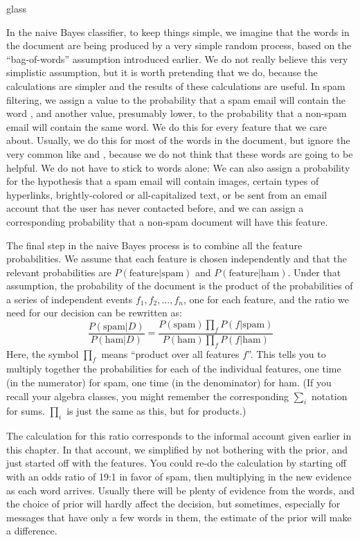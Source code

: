 \begin{tblsfilledsymbol}{}{glass}
\begin{underthehood}
In the naive Bayes classifier, to keep things simple, we imagine that
the words in the document are being produced by a very simple random
process, based on the ``bag-of-words'' assumption introduced
earlier. We do not really believe this very simplistic assumption, but
it is worth pretending that we do, because the calculations are
simpler and the results of these calculations are useful.  In spam
filtering, we assign a value to the probability that a spam email
 will contain the word , and another value,
presumably lower, to the probability that a non-spam email will
contain the same word. We do this for every feature that we care
about.  Usually, we do this for most of the words in the document,
but ignore the very common  like  and
, because we do not think that these words are going to be
helpful.  We do not have to stick to
words alone: We can also assign a probability for the hypothesis that
a spam email will contain images, certain types of hyperlinks, brightly-colored or all-capitalized text,  or be sent from an email account that the user has never contacted before, and we can assign a
corresponding probability that a non-spam document will have this
feature.

The final step in the naive Bayes process is to combine  all
the feature probabilities. We assume that each feature is chosen
independently and that the relevant probabilities are
\(P(\mbox{feature}|\mbox{spam})\) and
\(P(\mbox{feature}|\mbox{ham})\). Under that assumption, the probability of the
document is the product of the probabilities of a series of
independent events 
\(f_1,f_2,\ldots,f_n\),
one for each feature, and the ratio we need for our decision can be
rewritten as:
\[
  \frac{P(\mbox{spam}|D)}{P(\mbox{ham}|D)} =  \frac{P(\mbox{spam})\prod_f P(f|\mbox{spam})}{P(\mbox{ham})\prod_f P(f|\mbox{ham})}
\]
Here, the symbol \(\prod_f\) means ``product over all features
\(f\)''. This tells you to multiply together the probabilities for each
of the individual features, one time (in the numerator) for spam, one
time (in the denominator) for ham. (If you recall your algebra classes,
you might remember the corresponding \(\sum_i\) notation for
sums. \(\prod_i\) is just the same as this, but for products.)

The calculation for this ratio corresponds to the informal account
given earlier in this chapter. In that account, we simplified by not
bothering with the prior, and just started off with the features. You
could re-do the calculation by starting off with an odds ratio of 19:1
in favor of spam, then multiplying in the new evidence as each word
arrives. Usually there will be plenty of evidence from the words, and
the choice of prior will hardly affect the decision, but sometimes,
especially for messages that have only a few words in them, the
estimate of the prior will make a difference.


\end{underthehood}
\end{tblsfilledsymbol}
